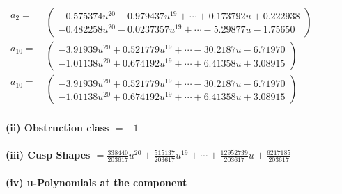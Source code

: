 \documentclass[1p]{elsarticle_modified}
\theoremstyle{definition}
\begin{document}
\begin{tabular}{m{7pt} m{180pt} m{7pt} m{180pt} }
\flushright $a_{2}=$&$\begin{pmatrix}-0.575374 u^{20}-0.979437 u^{19}+\cdots+0.173792 u+0.222938\\-0.482258 u^{20}-0.0237357 u^{19}+\cdots-5.29877 u-1.75650\end{pmatrix}$ \\
\flushright $a_{10}=$&$\begin{pmatrix}-3.91939 u^{20}+0.521779 u^{19}+\cdots-30.2187 u-6.71970\\-1.01138 u^{20}+0.674192 u^{19}+\cdots+6.41358 u+3.08915\end{pmatrix}$\\ \flushright $a_{10}=$&$\begin{pmatrix}-3.91939 u^{20}+0.521779 u^{19}+\cdots-30.2187 u-6.71970\\-1.01138 u^{20}+0.674192 u^{19}+\cdots+6.41358 u+3.08915\end{pmatrix}$\\&\end{tabular}
\flushleft \textbf{(ii) Obstruction class $= -1$}\\~\\
\flushleft \textbf{(iii) Cusp Shapes $= \frac{338440}{203617} u^{20}+\frac{515137}{203617} u^{19}+\cdots+\frac{12952739}{203617} u+\frac{6217185}{203617}$}\\~\\
\newpage\renewcommand{\arraystretch}{1}
\flushleft \textbf{(iv) u-Polynomials at the component}\newline \\
\end{document}
